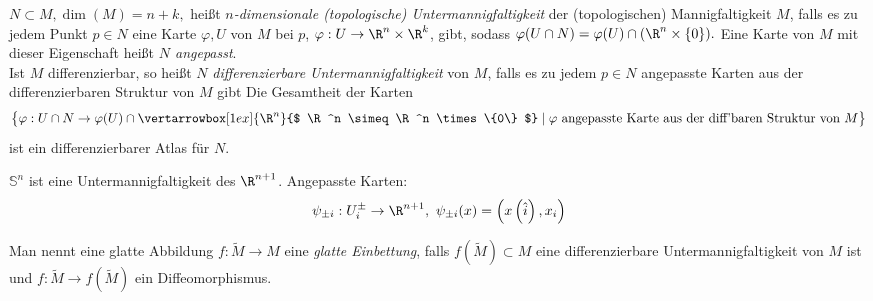 \begin{defn}
	$ N \subset M, \dim(M) = n+k, $ heißt \emph{$n$-dimensionale (topologische) Untermannigfaltigkeit} der (topologischen) Mannigfaltigkeit $M$, falls es zu jedem Punkt $p \in N$ eine Karte $ \varphi,U$ von $M$ bei $p$, $ \varphi: U \to \R^n \times \R^k $, gibt, sodass $ \varphi(U \cap N) = \varphi(U) \cap (\R^n \times \{0\}). $ Eine Karte von $M$ mit dieser Eigenschaft heißt \emph{$N$ angepasst}.\\
	Ist $M$ differenzierbar, so heißt $N$ \emph{differenzierbare Untermannigfaltigkeit} von $M$, falls es zu jedem $p \in N$ angepasste Karten aus der differenzierbaren Struktur von $M$ gibt Die Gesamtheit der Karten 
	$$ \big\{ \varphi: U \cap N \to \varphi(U) \cap \vertarrowbox[1ex]{\R^n}{$ \R^n \simeq \R^n \times \{0\} $} \mid \varphi\ \text{angepasste Karte aus der diff'baren Struktur von } M \big\} $$
	ist ein differenzierbarer Atlas für $N$.
	\begin{exmp*}
		$ \mathbb{S}^n $ ist eine Untermannigfaltigkeit des $\R^{n+1}$. Angepasste Karten:
		\[ \psi_{\pm i}: U_i^\pm \to \R^{n+1},\ \psi_{\pm i}(x) = \left( x \left( \hat{i} \right),x_i \right) \]
	\end{exmp*}
	Man nennt eine glatte Abbildung $ f: \tilde{M} \to M $ eine \emph{glatte Einbettung}, falls $ f\left( \tilde{M} \right) \subset M $ eine differenzierbare Untermannigfaltigkeit von $M$ ist und $ f: \tilde{M} \to f\left( \tilde{M} \right) $ ein Diffeomorphismus.
\end{defn}

